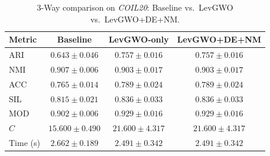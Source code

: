\begin{table}[htbp]
\centering
\caption{3-Way comparison on \textit{COIL20}: Baseline vs.\ LevGWO vs.\ LevGWO+DE+NM.}
\label{tab:coil20_3way}
\begin{tabular}{lccc}
\toprule
Metric & Baseline & LevGWO-only & LevGWO+DE+NM \\
\midrule
ARI & $0.643 \pm 0.046$ & $\mathbf{0.757 \pm 0.016}$ & $\mathbf{0.757 \pm 0.016}$ \\
NMI & $\mathbf{0.907 \pm 0.006}$ & $0.903 \pm 0.017$ & $0.903 \pm 0.017$ \\
ACC & $0.765 \pm 0.014$ & $\mathbf{0.789 \pm 0.024}$ & $\mathbf{0.789 \pm 0.024}$ \\
SIL & $0.815 \pm 0.021$ & $\mathbf{0.836 \pm 0.033}$ & $\mathbf{0.836 \pm 0.033}$ \\
MOD & $0.902 \pm 0.006$ & $\mathbf{0.929 \pm 0.016}$ & $\mathbf{0.929 \pm 0.016}$ \\
$C$ & $15.600 \pm 0.490$ & $21.600 \pm 4.317$ & $21.600 \pm 4.317$ \\
Time (s) & $2.662 \pm 0.189$ & $2.491 \pm 0.342$ & $2.491 \pm 0.342$ \\
\bottomrule
\end{tabular}
\end{table}